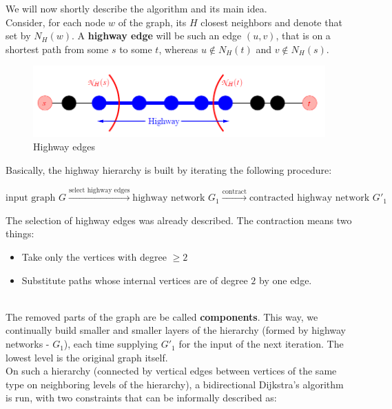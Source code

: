 \documentclass[a4paper]{article}
\begin{document}
        We will now shortly describe the algorithm and its main idea. \\

        Consider, for each node $w$ of the graph, its $H$ closest neighbors and denote that set by $N_{H}(w)$. A \textbf{highway edge} will be such an edge $(u, v)$, that is on a shortest path from some $s$ to some $t$, whereas $u \not \in N_{H}(t)$ and $v \not \in N_{H}(s)$. \\

        \begin{figure}[h!]
            \includegraphics[scale=0.57]{highway.png}
            \caption{\label{fig:highway} Highway edges}
        \end{figure}

        Basically, the highway hierarchy is built by iterating the following procedure: \\

        \begin{center}
            $\text{input graph } G \xrightarrow{\text{select highway edges}} \text{highway network } G_1 \xrightarrow{\text{contract}} \text{contracted highway network } G'_1$
        \end{center}

        The selection of highway edges was already described. The contraction means two things:
        \begin{itemize}
            \item Take only the vertices with degree $\geq 2$
            \item Substitute paths whose internal vertices are of degree $2$ by one edge.
        \end{itemize}
        {\hfill}\\

        The removed parts of the graph are be called \textbf{components}. This way, we continually build smaller and smaller layers of the hierarchy (formed by highway networks - $G_1$), each time supplying $G'_1$ for the input of the next iteration. The lowest level is the original graph itself. \\

        On such a hierarchy (connected by vertical edges between vertices of the same type on neighboring levels of the hierarchy), a bidirectional Dijkstra's algorithm is run, with two constraints that can be informally described as: \\
\end{document}
